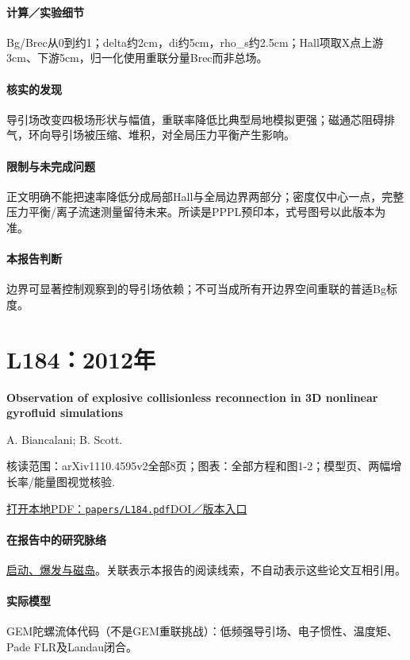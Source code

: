 \documentclass[UTF8,a4paper,11pt,openany,fontset=fandol]{ctexbook}
\begin{document}
\paragraph{计算／实验细节}Bg/Brec从0到约1；delta约2cm，di约5cm，rho\_s约2.5cm；Hall项取X点上游3cm、下游5cm，归一化使用重联分量Brec而非总场。

\paragraph{核实的发现}导引场改变四极场形状与幅值，重联率降低比典型局地模拟更强；磁通芯阻碍排气，环向导引场被压缩、堆积，对全局压力平衡产生影响。

\paragraph{限制与未完成问题}正文明确不能把速率降低分成局部Hall与全局边界两部分；密度仅中心一点，完整压力平衡/离子流速测量留待未来。所读是PPPL预印本，式号图号以此版本为准。

\paragraph{本报告判断}边界可显著控制观察到的导引场依赖；不可当成所有开边界空间重联的普适Bg标度。

\section{L184：2012年}\label{paper:L184}

\textbf{Observation of explosive collisionless reconnection in 3D nonlinear gyrofluid simulations}\citep{L184}\

A. Biancalani;  B. Scott.

\textsf{核读范围：}arXiv1110.4595v2全部8页；\textsf{图表：}全部方程和图1-2；模型页、两幅增长率/能量图视觉核验.

\href{run:../papers/L184.pdf}{打开本地PDF：\texttt{papers/L184.pdf}}\quad\href{https://doi.org/10.1209/0295-5075/97/15005}{DOI／版本入口}

\paragraph{在报告中的研究脉络}\hyperref[story:onset]{启动、爆发与磁岛}。关联表示本报告的阅读线索，不自动表示这些论文互相引用。

\paragraph{实际模型}GEM陀螺流体代码（不是GEM重联挑战）：低频强导引场、电子惯性、温度矩、Pade FLR及Landau闭合。
\end{document}
